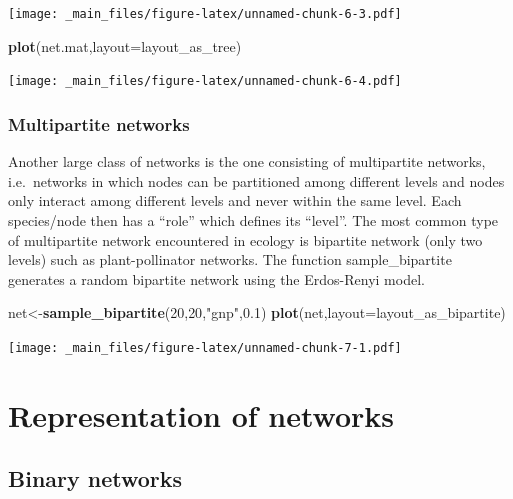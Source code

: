 \documentclass[
]{book}
\newenvironment{Shaded}{\begin{snugshade}}{\end{snugshade}}
\newcommand{\AttributeTok}[1]{\textcolor[rgb]{0.13,0.29,0.53}{#1}}
\newcommand{\DecValTok}[1]{\textcolor[rgb]{0.00,0.00,0.81}{#1}}
\newcommand{\FloatTok}[1]{\textcolor[rgb]{0.00,0.00,0.81}{#1}}
\newcommand{\FunctionTok}[1]{\textcolor[rgb]{0.13,0.29,0.53}{\textbf{#1}}}
\newcommand{\NormalTok}[1]{#1}
\newcommand{\OtherTok}[1]{\textcolor[rgb]{0.56,0.35,0.01}{#1}}
\newcommand{\StringTok}[1]{\textcolor[rgb]{0.31,0.60,0.02}{#1}}
\theoremstyle{definition}
\theoremstyle{definition}
\theoremstyle{definition}
\theoremstyle{definition}
\theoremstyle{remark}
\begin{document}
\texttt{[image: \_main\_files/figure-latex/unnamed-chunk-6-3.pdf]}

\begin{Shaded}
\begin{Highlighting}[]
\FunctionTok{plot}\NormalTok{(net.mat,}\AttributeTok{layout=}\NormalTok{layout\_as\_tree)}
\end{Highlighting}
\end{Shaded}

\texttt{[image: \_main\_files/figure-latex/unnamed-chunk-6-4.pdf]}

\subsubsection{Multipartite networks}\label{multipartite-networks}

Another large class of networks is the one consisting of multipartite networks, i.e.~networks in which nodes can be partitioned among different levels and nodes only interact among different levels and never within the same level.
Each species/node then has a ``role'' which defines its ``level''.
The most common type of multipartite network encountered in ecology is bipartite network (only two levels) such as plant-pollinator networks.
The function sample\_bipartite generates a random bipartite network using the Erdos-Renyi model.

\begin{Shaded}
\begin{Highlighting}[]
\NormalTok{net}\OtherTok{\textless{}{-}}\FunctionTok{sample\_bipartite}\NormalTok{(}\DecValTok{20}\NormalTok{,}\DecValTok{20}\NormalTok{,}\StringTok{"gnp"}\NormalTok{,}\FloatTok{0.1}\NormalTok{)}
\FunctionTok{plot}\NormalTok{(net,}\AttributeTok{layout=}\NormalTok{layout\_as\_bipartite)}
\end{Highlighting}
\end{Shaded}

\texttt{[image: \_main\_files/figure-latex/unnamed-chunk-7-1.pdf]}

\section{Representation of networks}\label{representation-of-networks}

\subsection{Binary networks}\label{binary-networks}
\end{document}
